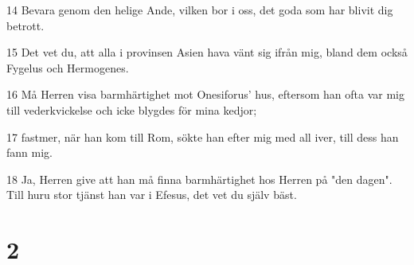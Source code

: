 \par 14 Bevara genom den helige Ande, vilken bor i oss, det goda som har blivit dig betrott.
\par 15 Det vet du, att alla i provinsen Asien hava vänt sig ifrån mig, bland dem också Fygelus och Hermogenes.
\par 16 Må Herren visa barmhärtighet mot Onesiforus' hus, eftersom han ofta var mig till vederkvickelse och icke blygdes för mina kedjor;
\par 17 fastmer, när han kom till Rom, sökte han efter mig med all iver, till dess han fann mig.
\par 18 Ja, Herren give att han må finna barmhärtighet hos Herren på "den dagen". Till huru stor tjänst han var i Efesus, det vet du själv bäst.

\chapter{2}

